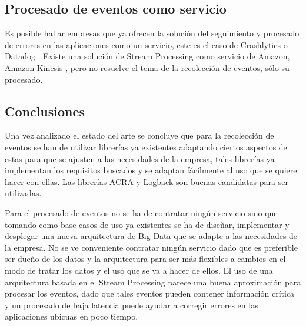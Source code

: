 \subsection{Procesado de eventos como servicio}
Es posible hallar empresas que ya ofrecen la solución del seguimiento y procesado de errores en las aplicaciones como un servicio, este es el caso de Crashlytics \cite{Tfg:crashlytics} o Datadog \cite{Tfg:datadog}. Existe una solución de Stream Processing como servicio de Amazon, Amazon Kinesis \cite{Tfg:kinesis}, pero no resuelve el tema de la recolección de eventos, sólo su procesado.

\subsection{Conclusiones}
Una vez analizado el estado del arte se concluye que para la recolección de eventos se han de utilizar librerías ya existentes adaptando ciertos aspectos de estas para que se ajusten a las necesidades de la empresa, tales librerías ya implementan los requisitos buscados y se adaptan fácilmente al uso que se quiere hacer con ellas. Las librerías ACRA y Logback son buenas candidatas para ser utilizadas.

Para el procesado de eventos no se ha de contratar ningún servicio sino que tomando como base casos de uso ya existentes se ha de diseñar, implementar y desplegar una nueva arquitectura de Big Data que se adapte a las necesidades de la empresa. No se ve conveniente contratar ningún servicio dado que es preferible ser dueño de los datos y la arquitectura para ser más flexibles a cambios en el modo de tratar los datos y el uso que se va a hacer de ellos. El uso de una arquitectura basada en el Stream Processing parece una buena aproximación para procesar los eventos, dado que tales eventos pueden contener información crítica y un procesado de baja latencia puede ayudar a corregir errores en las aplicaciones ubicuas en poco tiempo.



